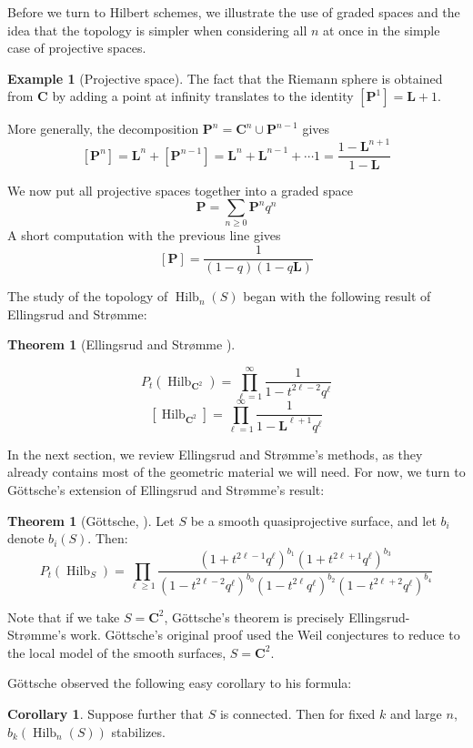 \documentclass{amsart}[12pt]
\theoremstyle{definition}
\newtheorem{theorem}[dummy]{Theorem}
\newtheorem{example}[dummy]{Example}
\newtheorem{corollary}[dummy]{Corollary}
\newcommand{\C}{\mathbf{C}}
\newcommand{\LL}{\mathbf{L}}
\newcommand{\proj}{\mathbf{P}}
\DeclareMathOperator{\Hilb}{Hilb}
\newcommand{\HG}{\Hilb}
\begin{document}
Before we turn to Hilbert schemes, we illustrate the use of graded spaces and the idea that the topology is simpler when considering all $n$ at once in the simple case of projective spaces.


\begin{example}[Projective space]
The fact that the Riemann sphere is obtained from $\C$ by adding a point at infinity translates to the identity $[\proj^1]=\LL+1$.

More generally, the decomposition $\proj^n=\C^n\cup \proj^{n-1}$ gives
$$[\proj^n]=\LL^n+[\proj^{n-1}]=\LL^n+\LL^{n-1}+\cdots 1=\frac{1-\LL^{n+1}}{1-\LL}$$


We now put all projective spaces together into a graded space 
$$\proj=\sum_{n\geq 0} \proj^nq^n$$ 
A short computation with the previous line gives
$$[\proj]=\frac{1}{(1-q)(1-q\LL)}$$
\end{example}


The study of the topology of $\Hilb_n(S)$ began with the following result of Ellingsrud and Str\o mme:
\begin{theorem}[Ellingsrud and Str\o mme \cite{ES}] \label{thm:ES}

$$P_t(\HG_{\C^2})=\prod_{\ell=1}^\infty \frac{1}{1-t^{2\ell-2}q^\ell}$$
$$[\HG_{\C^2}]=\prod_{\ell=1}^\infty \frac{1}{1-\LL^{\ell +1}q^\ell}$$
\end{theorem}



In the next section, we review Ellingsrud and Str\o mme's methods, as they already contains most of the geometric material we will need.  For now, we turn to G\"ottsche's extension of Ellingsrud and Str\o mme's result:

\begin{theorem}[G\"ottsche, \cite{gottsche}]
Let $S$ be a smooth quasiprojective surface, and let $b_i$ denote $b_i(S)$.  Then:
$$P_t(\HG_S)=\prod_{\ell\geq 1} \frac{(1+t^{2\ell-1}q^\ell)^{b_1}(1+t^{2\ell+1}q^\ell)^{b_3}}{(1-t^{2\ell-2}q^\ell)^{b_0}(1-t^{2\ell}q^\ell)^{b_2}(1-t^{2\ell+2}q^\ell)^{b_4}}$$
\end{theorem}

Note that if we take $S=\C^2$, G\"ottsche's theorem is precisely Ellingsrud-Str\o mme's work.  G\"ottsche's original proof used the Weil conjectures to reduce to the local model of the smooth surfaces, $S=\C^2$.  

G\"ottsche observed the following easy corollary to his formula:
\begin{corollary}  Suppose further that $S$ is connected.
Then for fixed $k$ and large $n$, $b_{k}(\Hilb_n(S))$ stabilizes.

\end{corollary}
\end{document}
